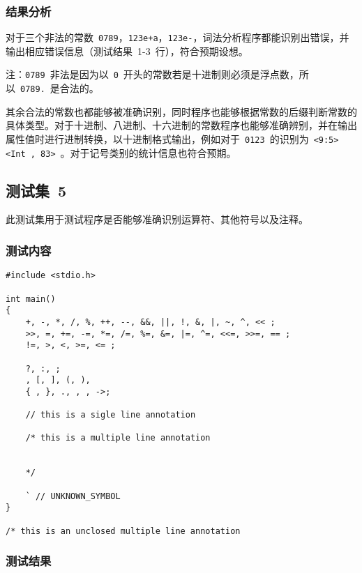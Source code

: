 \documentclass[lang=cn,11pt,a4paper]{paper}
\begin{document}
\subsubsection{结果分析}

对于三个非法的常数\ \lstinline{0789}，\lstinline{123e+a}，\lstinline{123e-}，词法分析程序都能识别出错误，并输出相应错误信息（测试结果\ 1-3\ 行），符合预期设想。

注：\lstinline{0789}\ 非法是因为以\ \lstinline{0}\ 开头的常数若是十进制则必须是浮点数，所以\ \lstinline{0789.}\ 是合法的。

其余合法的常数也都能够被准确识别，同时程序也能够根据常数的后缀判断常数的具体类型。对于十进制、八进制、十六进制的常数程序也能够准确辨别，并在输出属性值时进行进制转换，以十进制格式输出，例如对于\ \lstinline{0123}\ 的识别为\ \lstinline{<9:5><Int , 83>}\ 。对于记号类别的统计信息也符合预期。

\subsection{测试集\ 5}

此测试集用于测试程序是否能够准确识别运算符、其他符号以及注释。

\subsubsection{测试内容}

\begin{lstlisting}
#include <stdio.h>

int main()
{
    +, -, *, /, %, ++, --, &&, ||, !, &, |, ~, ^, << ;
    >>, =, +=, -=, *=, /=, %=, &=, |=, ^=, <<=, >>=, == ;
    !=, >, <, >=, <= ;

    ?, :, ;
    , [, ], (, ),
    { , }, ., , , ->;

    // this is a sigle line annotation

    /* this is a multiple line annotation


    */

    ` // UNKNOWN_SYMBOL
}

/* this is an unclosed multiple line annotation

\end{lstlisting}

\subsubsection{测试结果}
\end{document}
